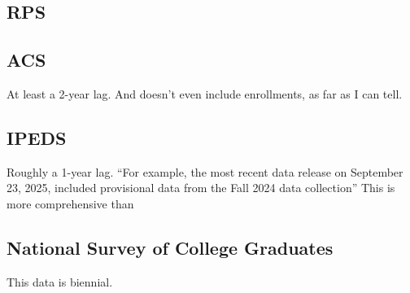 \documentclass[12pt]{article}
\begin{document}
\subsection{RPS}

\subsection{ACS}
At least a 2-year lag. And doesn't even include enrollments, as far as I can tell. 
\subsection{IPEDS}
Roughly a 1-year lag. ``For example, the most recent data release on September 23, 2025, included provisional data from the Fall 2024 data collection''
This is more comprehensive than 

\subsection{National Survey of College Graduates}
This data is biennial. 
\end{document}
